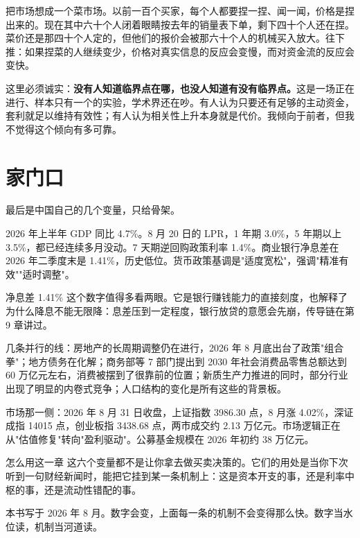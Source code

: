 把市场想成一个菜市场。以前一百个买家，每个人都要捏一捏、闻一闻，价格是捏出来的。现在其中六十个人闭着眼睛按去年的销量表下单，剩下四十个人还在捏。菜价还是那四十个人定的，但他们的报价会被那六十个人的机械买入放大。往下推：如果捏菜的人继续变少，价格对真实信息的反应会变慢，而对资金流的反应会变快。

这里必须诚实：\textbf{没有人知道临界点在哪，也没人知道有没有临界点。}这是一场正在进行、样本只有一个的实验，学术界还在吵。有人认为只要还有足够的主动资金，套利就足以维持有效性；有人认为相关性上升本身就是代价。我倾向于前者，但我不觉得这个倾向有多可靠。

\section{家门口}

最后是中国自己的几个变量，只给骨架。

2026 年上半年 GDP 同比 4.7\%。8 月 20 日的 LPR，1 年期 3.0\%，5 年期以上 3.5\%，都已经连续多月没动。7 天期逆回购政策利率 1.4\%。商业银行净息差在 2026 年二季度末是 1.41\%，历史低位。货币政策基调是"适度宽松"，强调"精准有效""适时调整"。

净息差 1.41\% 这个数字值得多看两眼。它是银行赚钱能力的直接刻度，也解释了为什么降息不能无限降：息差压到一定程度，银行放贷的意愿会先崩，传导链在第 9 章讲过。

几条并行的线：房地产的长周期调整仍在进行，2026 年 8 月底出台了政策"组合拳"；地方债务在化解；商务部等 7 部门提出到 2030 年社会消费品零售总额达到 60 万亿元左右，消费被摆到了很靠前的位置；新质生产力推进的同时，部分行业出现了明显的内卷式竞争；人口结构的变化是所有这些的背景板。

市场那一侧：2026 年 8 月 31 日收盘，上证指数 3986.30 点，8 月涨 4.02\%，深证成指 14015 点，创业板指 3438.68 点，两市成交约 2.13 万亿元。市场逻辑正在从"估值修复"转向"盈利驱动"。公募基金规模在 2026 年初约 38 万亿元。

\begin{databox}{怎么用这一章}
这六个变量都不是让你拿去做买卖决策的。它们的用处是当你下次听到一句财经新闻时，能把它挂到某一条机制上：这是资本开支的事，还是利率中枢的事，还是流动性错配的事。

本书写于 2026 年 8 月。数字会变，上面每一条的机制不会变得那么快。数字当水位读，机制当河道读。

\end{databox}

